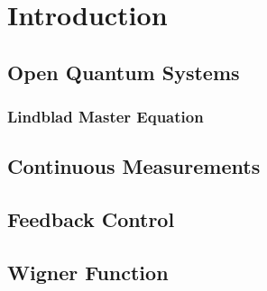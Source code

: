\section{Introduction}
\cite{Annby-Andersson:2024aa}
\subsection{Open Quantum Systems}
\subsubsection{Lindblad Master Equation}
\subsection{Continuous Measurements}
\subsection{Feedback Control}
\subsection{Wigner Function}
